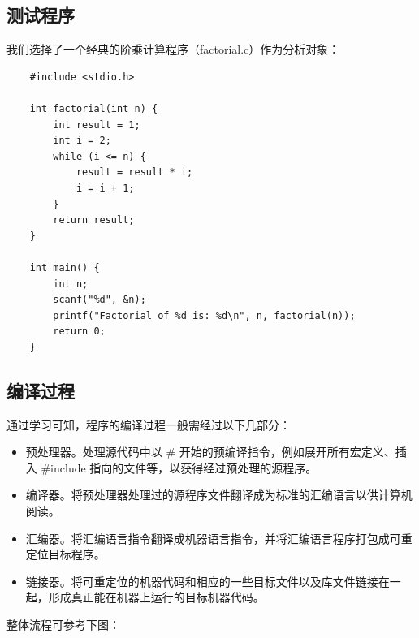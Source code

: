 \documentclass[a4paper]{article}
\begin{document}
\subsection{测试程序}
我们选择了一个经典的阶乘计算程序（factorial.c）作为分析对象：

\begin{lstlisting}
	#include <stdio.h>

	int factorial(int n) {
		int result = 1;
		int i = 2;
		while (i <= n) {
			result = result * i;
			i = i + 1;
		}
		return result;
	}

	int main() {
		int n;
		scanf("%d", &n);
		printf("Factorial of %d is: %d\n", n, factorial(n));
		return 0;
	}
\end{lstlisting}

\subsection{编译过程}
通过学习可知，程序的编译过程一般需经过以下几部分：

\begin{itemize}
	
\item 预处理器。处理源代码中以 \# 开始的预编译指令，例如展开所有宏定义、插入 \#include 指向的文件等，以获得经过预处理的源程序。

\item 编译器。将预处理器处理过的源程序文件翻译成为标准的汇编语言以供计算机阅读。

\item 汇编器。将汇编语言指令翻译成机器语言指令，并将汇编语言程序打包成可重定位目标程序。

\item 链接器。将可重定位的机器代码和相应的一些目标文件以及库文件链接在一起，形成真正能在机器上运行的目标机器代码。

\end{itemize}
整体流程可参考下图：
\end{document}
